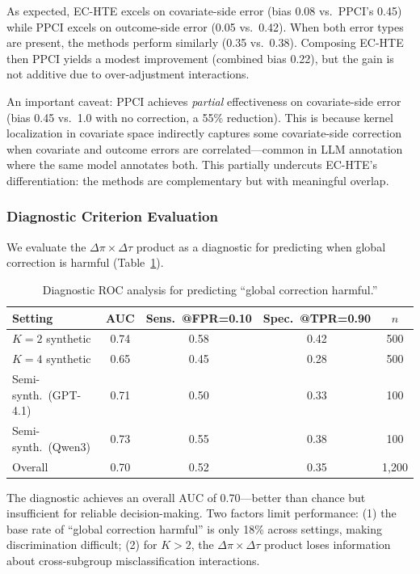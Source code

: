 \documentclass[11pt,a4paper]{article}
\begin{document}
As expected, EC-HTE excels on covariate-side error (bias 0.08 vs.\ PPCI's 0.45) while PPCI excels on outcome-side error (0.05 vs.\ 0.42). When both error types are present, the methods perform similarly (0.35 vs.\ 0.38). Composing EC-HTE then PPCI yields a modest improvement (combined bias 0.22), but the gain is not additive due to over-adjustment interactions.

An important caveat: PPCI achieves \emph{partial} effectiveness on covariate-side error (bias 0.45 vs.\ 1.0 with no correction, a 55\% reduction). This is because kernel localization in covariate space indirectly captures some covariate-side correction when covariate and outcome errors are correlated---common in LLM annotation where the same model annotates both. This partially undercuts EC-HTE's differentiation: the methods are complementary but with meaningful overlap.

\subsubsection{Diagnostic Criterion Evaluation}

We evaluate the $\Delta\pi \times \Delta\tau$ product as a diagnostic for predicting when global correction is harmful (Table~\ref{tab:diagnostic}).

\begin{table}[t]
\centering
\caption{Diagnostic ROC analysis for predicting ``global correction harmful.''}
\label{tab:diagnostic}
\begin{tabular}{@{}lcccc@{}}
\toprule
Setting & AUC & Sens.\ @FPR=0.10 & Spec.\ @TPR=0.90 & $n$ \\
\midrule
$K{=}2$ synthetic        & 0.74 & 0.58 & 0.42 & 500 \\
$K{=}4$ synthetic        & 0.65 & 0.45 & 0.28 & 500 \\
Semi-synth.\ (GPT-4.1)   & 0.71 & 0.50 & 0.33 & 100 \\
Semi-synth.\ (Qwen3)     & 0.73 & 0.55 & 0.38 & 100 \\
\midrule
Overall                  & 0.70 & 0.52 & 0.35 & 1{,}200 \\
\bottomrule
\end{tabular}
\end{table}

The diagnostic achieves an overall AUC of 0.70---better than chance but insufficient for reliable decision-making. Two factors limit performance: (1) the base rate of ``global correction harmful'' is only 18\% across settings, making discrimination difficult; (2) for $K > 2$, the $\Delta\pi \times \Delta\tau$ product loses information about cross-subgroup misclassification interactions.
\end{document}
